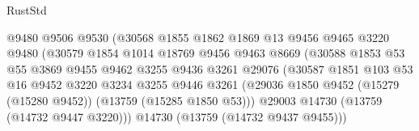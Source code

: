 \begin{lexlean}{RustStd}
\begin{coremodule}
                                      @9480
                                      @9506
                                      @9530
                                      (@30568
                                        @1855
                                        @1862
                                        @1869
                                        @13
                                        @9456
                                        @9465
                                        @3220
                                        @9480
                                        (@30579
                                          @1854
                                          @1014
                                          @18769
                                          @9456
                                          @9463
                                          @8669
                                          (@30588
                                            @1853
                                            @53
                                            @55
                                            @3869
                                            @9455
                                            @9462
                                            @3255
                                            @9436
                                            @3261
                                            @29076
                                            (@30587
                                              @1851
                                              @103
                                              @53
                                              @16
                                              @9452
                                              @3220
                                              @3234
                                              @3255
                                              @9446
                                              @3261
                                              (@29036
                                                @1850
                                                @9452
                                                (@15279 (@15280 @9452))
                                                (@13759 (@15285 @1850 @53)))
                                              @29003
                                              @14730
                                              (@13759 (@14732 @9447 @3220)))
                                            @14730
                                            (@13759 (@14732 @9437 @9455)))

\end{coremodule}
\end{lexlean}
